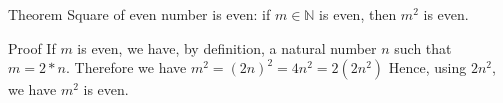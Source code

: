 Theorem Square of even number is even: 
if $m \in \mathbb{N}$ is even, then $m^2$ is even.


Proof
If $m$ is even, we have, by definition, a natural number $n$ such that $m = 2 * n$.
Therefore we have $m^2 = (2n)^2 = 4n^2 = 2 (2n^2)$
Hence, using $2n^2$, we have $m^2$ is even.